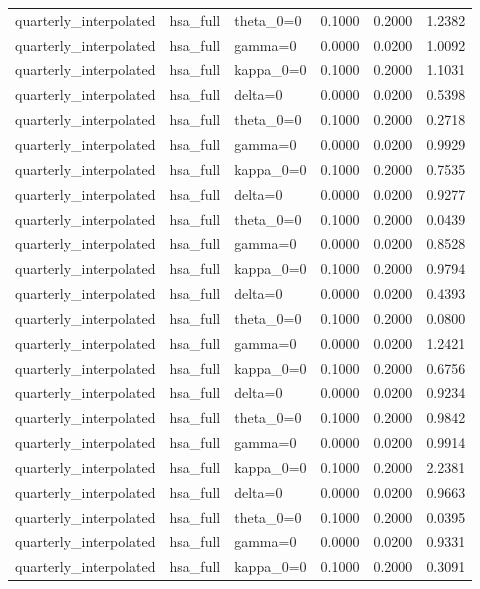 \begin{tabular}{lllrrr}
quarterly\_interpolated & hsa\_full & theta\_0=0 & 0.1000 & 0.2000 & 1.2382 \\
quarterly\_interpolated & hsa\_full & gamma=0 & 0.0000 & 0.0200 & 1.0092 \\
quarterly\_interpolated & hsa\_full & kappa\_0=0 & 0.1000 & 0.2000 & 1.1031 \\
quarterly\_interpolated & hsa\_full & delta=0 & 0.0000 & 0.0200 & 0.5398 \\
quarterly\_interpolated & hsa\_full & theta\_0=0 & 0.1000 & 0.2000 & 0.2718 \\
quarterly\_interpolated & hsa\_full & gamma=0 & 0.0000 & 0.0200 & 0.9929 \\
quarterly\_interpolated & hsa\_full & kappa\_0=0 & 0.1000 & 0.2000 & 0.7535 \\
quarterly\_interpolated & hsa\_full & delta=0 & 0.0000 & 0.0200 & 0.9277 \\
quarterly\_interpolated & hsa\_full & theta\_0=0 & 0.1000 & 0.2000 & 0.0439 \\
quarterly\_interpolated & hsa\_full & gamma=0 & 0.0000 & 0.0200 & 0.8528 \\
quarterly\_interpolated & hsa\_full & kappa\_0=0 & 0.1000 & 0.2000 & 0.9794 \\
quarterly\_interpolated & hsa\_full & delta=0 & 0.0000 & 0.0200 & 0.4393 \\
quarterly\_interpolated & hsa\_full & theta\_0=0 & 0.1000 & 0.2000 & 0.0800 \\
quarterly\_interpolated & hsa\_full & gamma=0 & 0.0000 & 0.0200 & 1.2421 \\
quarterly\_interpolated & hsa\_full & kappa\_0=0 & 0.1000 & 0.2000 & 0.6756 \\
quarterly\_interpolated & hsa\_full & delta=0 & 0.0000 & 0.0200 & 0.9234 \\
quarterly\_interpolated & hsa\_full & theta\_0=0 & 0.1000 & 0.2000 & 0.9842 \\
quarterly\_interpolated & hsa\_full & gamma=0 & 0.0000 & 0.0200 & 0.9914 \\
quarterly\_interpolated & hsa\_full & kappa\_0=0 & 0.1000 & 0.2000 & 2.2381 \\
quarterly\_interpolated & hsa\_full & delta=0 & 0.0000 & 0.0200 & 0.9663 \\
quarterly\_interpolated & hsa\_full & theta\_0=0 & 0.1000 & 0.2000 & 0.0395 \\
quarterly\_interpolated & hsa\_full & gamma=0 & 0.0000 & 0.0200 & 0.9331 \\
quarterly\_interpolated & hsa\_full & kappa\_0=0 & 0.1000 & 0.2000 & 0.3091 \\

\end{tabular}

